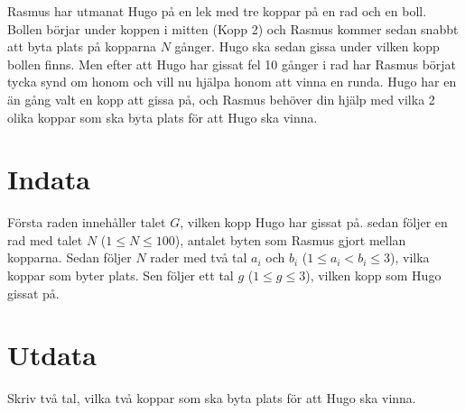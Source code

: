 
Rasmus har utmanat Hugo på en lek med tre koppar på en rad och en boll. Bollen börjar under koppen i mitten (Kopp 2) och Rasmus kommer sedan snabbt att byta plats på kopparna $N$ gånger.
Hugo ska sedan gissa under vilken kopp bollen finns. Men efter att Hugo har gissat fel 10 gånger i rad har Rasmus börjat tycka synd om honom och vill nu hjälpa honom att vinna en runda.
Hugo har en än gång valt en kopp att gissa på, och Rasmus behöver din hjälp med vilka 2 olika koppar som ska byta plats för att Hugo ska vinna.

\section*{Indata}
Första raden innehåller talet $G$, vilken kopp Hugo har gissat på.
sedan följer en rad med talet $N$ ($1 \le N \le 100$), antalet byten som Rasmus gjort mellan kopparna.
Sedan följer $N$ rader med två tal $a_i$ och $b_i$ ($1 \le a_i < b_i \le 3$), vilka koppar som byter plats.
Sen följer ett tal $g$ ($1 \le g \le 3$), vilken kopp som Hugo gissat på.

\section*{Utdata}
Skriv två tal, vilka två koppar som ska byta plats för att Hugo ska vinna.

